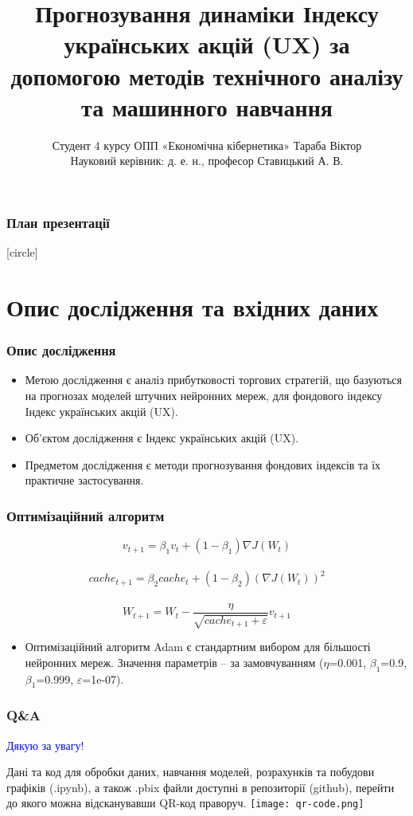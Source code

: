 \documentclass[aspectratio=169]{beamer}
\title{Прогнозування динаміки Індексу українських акцій (UX) за допомогою методів технічного аналізу та машинного навчання}
\author{Студент 4 курсу ОПП «Економічна кібернетика» Тараба Віктор\\ Науковий керівник: д. е. н., професор Ставицький А. В.}
\institute{Київський національний університет імені Тараса Шевченка\\Економічний факультет\\Кафедра економічної кібернетики}
\begin{document}
	
\begin{frame}
\titlepage
\end{frame}

\begin{frame}
\frametitle{План презентації}
[circle]
\tableofcontents
\end{frame}

\section{Опис дослідження та вхідних даних}

\begin{frame}
\frametitle{Опис дослідження}
\begin{itemize}
\item \alert {Метою дослідження}  є  аналіз  прибутковості  торгових  стратегій, що базуються  на  прогнозах  моделей  штучних  нейронних  мереж,  для  фондового індексу Індекс українських акцій (UX).
\bigskip
\item \alert {Об’єктом дослідження} є Індекс українських акцій (UX).
\bigskip
\item \alert {Предметом дослідження} є методи прогнозування фондових індексів та їх практичне застосування.

\end{itemize}
\end{frame}

\begin{frame}
\frametitle{Оптимізаційний алгоритм}
\[ v_{t+1} = \beta_{1} v_{t} + (1-\beta_{1})\nabla J(W_{t}) \]\\
\[ cache_{t+1} = \beta_{2} cache_{t} + (1-\beta_{2})(\nabla J(W_{t}))^{2} \]\\
\[ W_{t+1} = W_{t}-\frac{\eta}{\sqrt{cache_{t+1}+\varepsilon}}v_{t+1} \]
\bigskip
\begin{itemize}
\item \alert {Оптимізаційний алгоритм Adam} є стандартним вибором для більшості нейронних мереж. Значення параметрів – за замовчуванням ($\eta$=0.001, $\beta_{1}$=0.9, $\beta_{1}$=0.999, $\varepsilon$=1e-07). 
\end{itemize}
\end{frame}

\begin{frame}
\frametitle{Q\&A}
\begin{center}
\bigskip
\textcolor{blue}{\huge Дякую за увагу!} \\
\end{center}
\begin{multicols}{2}

\vbox{\vspace{0.8cm}}
Дані та код для обробки даних, навчання моделей, розрахунків та побудови графіків (.ipynb), а також .pbix файли доступні в репозиторії (github), перейти до якого можна відсканувавши QR-код праворуч.
\columnbreak
\hspace{5mm}
\texttt{[image: qr-code.png]}
\end{multicols}
\end{frame}
\end{document}
